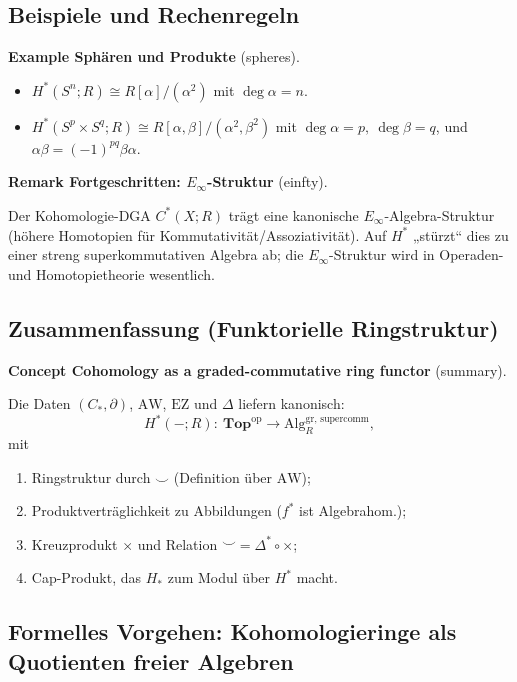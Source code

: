 \documentclass[10pt, letterpaper]{article}
\newcommand{\Alg}{\mathrm{Alg}}
\newcommand{\CustomHeading}[3]{%
  \par\medskip\noindent%
  \textbf{#1 #2} \textnormal{(#3)}.\enskip%
}
\newenvironment{REM}[2]{\begin{unitbox}\CustomHeading{Remark}{#1}{#2}}{\end{unitbox}}
\newenvironment{EXA}[2]{\begin{unitbox}\CustomHeading{Example}{#1}{#2}}{\end{unitbox}}
\newenvironment{CONC}[2]{\begin{unitbox}\CustomHeading{Concept}{#1}{#2}}{\end{unitbox}}
\begin{document}
\subsection{Beispiele und Rechenregeln}

\begin{EXA}{Sphären und Produkte}{spheres}
\begin{itemize}[leftmargin=*]
\item \(H^\ast(S^n;R)\cong R[\alpha]/(\alpha^2)\) mit \(\deg\alpha=n\).
\item \(H^\ast(S^p\times S^q;R)\cong R[\alpha,\beta]/(\alpha^2,\beta^2)\) mit \(\deg\alpha=p,\ \deg\beta=q\), und \(\alpha\beta=(-1)^{pq}\beta\alpha\).
\end{itemize}
\end{EXA}

\begin{REM}{Fortgeschritten: \(E_\infty\)-Struktur}{einfty}
Der Kohomologie-DGA \(C^\ast(X;R)\) trägt eine kanonische \(E_\infty\)-Algebra-Struktur (höhere Homotopien für Kommutativität/Assoziativität). Auf \(H^\ast\) „stürzt“ dies zu einer streng superkommutativen Algebra ab; die \(E_\infty\)-Struktur wird in Operaden- und Homotopietheorie wesentlich.
\end{REM}

\subsection{Zusammenfassung (Funktorielle Ringstruktur)}
\begin{CONC}{Cohomology as a graded-commutative ring functor}{summary}
Die Daten \((C_\ast,\partial)\), \(\mathrm{AW}\), \(\mathrm{EZ}\) und \(\Delta\) liefern kanonisch:
\[
H^\ast(-;R):\ \mathbf{Top}^{\mathrm{op}}\longrightarrow \Alg_R^{\mathrm{gr,\,supercomm}},
\]
mit
\begin{enumerate}[leftmargin=*]
\item Ringstruktur durch \(\smile\) (Definition über \(\mathrm{AW}\));
\item Produktverträglichkeit zu Abbildungen (\(f^\ast\) ist Algebrahom.);
\item Kreuzprodukt \(\times\) und Relation \(\smile=\Delta^\ast\circ\times\);
\item Cap-Produkt, das \(H_\ast\) zum Modul über \(H^\ast\) macht.
\end{enumerate}
\end{CONC}



\subsection{Formelles Vorgehen: Kohomologieringe als Quotienten freier Algebren}
\label{sec:cohom-ring-quotients}
\end{document}
